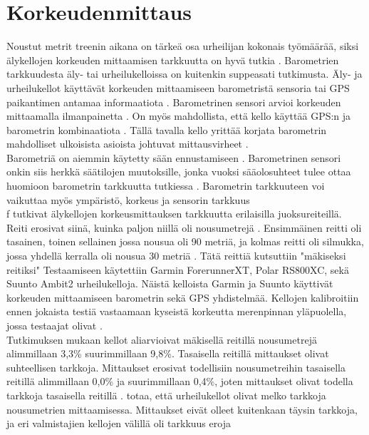 \documentclass[utf8,bachelor,finnish]{bachelor}
\begin{document}
  \section{Korkeudenmittaus}
    Noustut metrit treenin aikana on tärkeä osa urheilijan kokonais työmäärää, siksi älykellojen korkeuden mittaamisen tarkkuutta on hyvä tutkia \parencite{ammann_accuracy_2016}.
     Barometrien tarkkuudesta äly- tai urheilukelloissa on kuitenkin suppeasati tutkimusta. Äly- ja urheilukellot käyttävät korkeuden mittaamiseen barometristä sensoria tai GPS
      paikantimen antamaa informaatiota \parencite{ammann_accuracy_2016}. Barometrinen sensori arvioi korkeuden mittaamalla ilmanpainetta \parencite{aroganam2019review}.
      On myös mahdollista, että kello käyttää GPS:n ja barometrin kombinaatiota \parencite{aroganam2019review}. Tällä tavalla kello yrittää korjata barometrin mahdolliset ulkoisista asioista johtuvat mittausvirheet \parencite{aroganam2019review}.\\
       Barometriä on aiemmin käytetty sään ennustamiseen \parencite{manivannan_challenges_2020}.
        Barometrinen sensori onkin siis herkkä säätilojen muutoksille, jonka vuoksi sääolosuhteet tulee ottaa huomioon barometrin tarkkuutta tutkiessa \parencite{manivannan_challenges_2020, ammann_accuracy_2016}.
         Barometrin tarkkuuteen voi vaikuttaa myös ympäristö, korkeus ja sensorin tarkkuus \parencite[.]{manivannan_challenges_2020}\\
           
f
    \textcite{ammann_accuracy_2016} tutkivat älykellojen korkeusmittauksen tarkkuutta erilaisilla juoksureiteillä. Reiti erosivat siinä, kuinka paljon niillä oli nousumetrejä \parencite{ammann_accuracy_2016}.
     Ensimmäinen reitti oli tasainen, toinen sellainen jossa nousua oli 90 metriä, ja kolmas reitti oli silmukka, jossa yhdellä kerralla oli nousua 30 metriä \parencite[.]{ammann_accuracy_2016}.
       Tätä reittiä kutsuttiin "mäkiseksi reitiksi" \textcite{ammann_accuracy_2016}
      Testaamiseen käytettiin Garmin ForerunnerXT, Polar RS800XC, sekä Suunto Ambit2 urheilukelloja. Näistä kelloista Garmin ja
       Suunto käyttivät korkeuden mittaamiseen barometrin sekä GPS yhdistelmää. \parencite[.]{ammann_accuracy_2016}
        Kellojen kalibroitiin ennen jokaista testiä vastaamaan kyseistä korkeutta merenpinnan yläpuolella, jossa testaajat olivat \parencite{ammann_accuracy_2016}.\\

    Tutkimuksen mukaan kellot aliarvioivat mäkisellä reitillä nousumetrejä alimmillaan 3,3\% suurimmillaan 9,8\%. Tasaisella reitillä mittaukset olivat suhteellisen tarkkoja.
     Mittaukset erosivat todellisiin nousumetreihin tasaisella reitillä alimmillaan 0,0\% ja suurimmillaan 0,4\%, joten mittaukset olivat todella tarkkoja tasaisella reitillä \parencite{ammann_accuracy_2016}.
      \textcite{ammann_accuracy_2016} totaa, että urheilukellot olivat melko tarkkoja nousumetrien mittaamisessa. Mittaukset eivät olleet kuitenkaan
       täysin tarkkoja, ja eri valmistajien kellojen välillä oli tarkkuus eroja \parencite{ammann_accuracy_2016}\\
       
\end{document}

